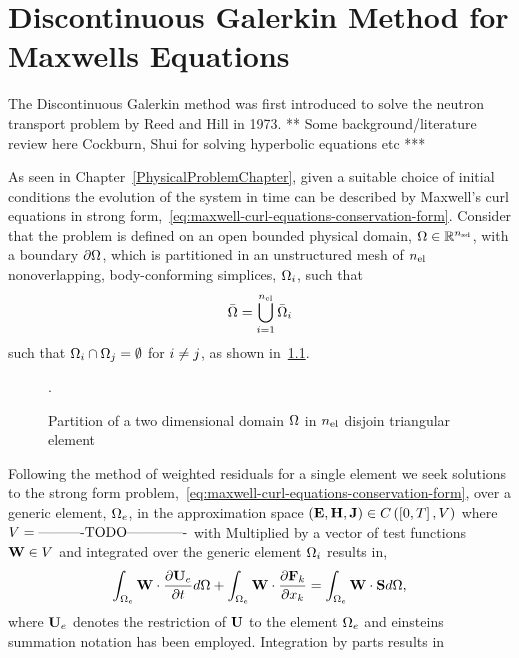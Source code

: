 \chapter{Discontinuous Galerkin Method for Maxwells Equations} %
\label{Chapter3}

The Discontinuous Galerkin method was first introduced to solve the neutron transport problem by Reed and Hill \cite{} in 1973.
** Some background/literature review here Cockburn, Shui for solving hyperbolic equations etc ***

As seen in Chapter~\ref{PhysicalProblemChapter}, given a suitable choice of
initial conditions the evolution of the system in time can be described by
Maxwell's curl equations in strong
form,~\eqref{eq:maxwell-curl-equations-conservation-form}. Consider that the problem is defined on an open bounded physical domain, $\Omega \in \mathbb{R}^{n_\textrm{sd}}$, with a boundary $\partial \Omega$,
which is partitioned in an unstructured mesh of $n_\textrm{el}$ nonoverlapping, body-conforming simplices, $\Omega_i$, such that
$$
\bar{\Omega} = \mathop{\bigcup}_{i=1}^{n_\textrm{el}} \bar{\Omega}_i
$$
such that $\Omega_i \cap \Omega_j = \emptyset $ for $i \neq j$, as shown in~\ref{fig:meshPartitionFigure}.
\begin{figure}
  \centering
  
  \caption{Partition of a two dimensional domain $\Omega$ in $n_\textrm{el}$ disjoin triangular element}
  \label{fig:meshPartitionFigure}.
\end{figure}

Following the method of weighted residuals for a single element we seek solutions to the strong form problem,~\eqref{eq:maxwell-curl-equations-conservation-form}, over a generic element, $\Omega_e$, in the approximation space $\left( \mathbf{E},\mathbf{H},\mathbf{J} \right) \in C \left( \left[ 0, T \right], V \right)$
where $V = \textrm{----------TODO-------------} $ with
Multiplied by a vector of test functions $\mathbf{W} \in V $ and integrated over the generic element $\Omega_i$ results in,
$$
\int_{\Omega_e} \mathbf{W} \cdot \frac{\partial \mathbf{U}_e}{\partial t} d\Omega  + \int_{\Omega_e} \mathbf{W} \cdot \frac{\partial \mathbf{F}_{k}}{\partial x_{k}}= \int_{\Omega_e} \mathbf{W} \cdot \mathbf{S} d\Omega,
$$
where $\mathbf{U}_e$ denotes the restriction of $\mathbf{U}$ to the element $\Omega_e$ and einsteins summation notation has been employed.
Integration by parts results in

